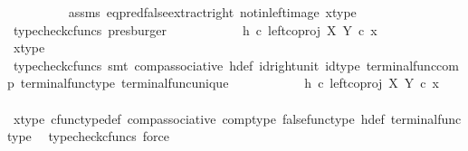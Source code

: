 \begin{isabellebody}
\ \ \ \ \ \ \ \ \isamarkupfalse%
\ assms\ eq{\isacharunderscore}{\kern0pt}pred{\isacharunderscore}{\kern0pt}false{\isacharunderscore}{\kern0pt}extract{\isacharunderscore}{\kern0pt}right\ not{\isacharunderscore}{\kern0pt}in{\isacharunderscore}{\kern0pt}left{\isacharunderscore}{\kern0pt}image\ x{\isacharunderscore}{\kern0pt}type\ \isamarkupfalse%
\ {\isacharparenleft}{\kern0pt}typecheck{\isacharunderscore}{\kern0pt}cfuncs{\isacharcomma}{\kern0pt}\ presburger{\isacharparenright}{\kern0pt}\isanewline
\ \ \ \ \ \ \isamarkupfalse%
\ \isamarkupfalse%
\ {\isachardoublequoteopen}{\isachardot}{\kern0pt}{\isachardot}{\kern0pt}{\isachardot}{\kern0pt}\ {\isacharequal}{\kern0pt}\ h\ {\isasymcirc}\isactrlsub c\ {\isacharparenleft}{\kern0pt}left{\isacharunderscore}{\kern0pt}coproj\ X\ Y\ {\isasymcirc}\isactrlsub c\ x{\isacharparenright}{\kern0pt}{\isachardoublequoteclose}\isanewline
\ \ \ \ \ \ \ \ \isamarkupfalse%
\ x{\isacharunderscore}{\kern0pt}type\ \isamarkupfalse%
\ {\isacharparenleft}{\kern0pt}typecheck{\isacharunderscore}{\kern0pt}cfuncs{\isacharcomma}{\kern0pt}\ smt\ comp{\isacharunderscore}{\kern0pt}associative{}\ h{\isacharunderscore}{\kern0pt}def\ id{\isacharunderscore}{\kern0pt}right{\isacharunderscore}{\kern0pt}unit{}\ id{\isacharunderscore}{\kern0pt}type\ terminal{\isacharunderscore}{\kern0pt}func{\isacharunderscore}{\kern0pt}comp\ terminal{\isacharunderscore}{\kern0pt}func{\isacharunderscore}{\kern0pt}type\ terminal{\isacharunderscore}{\kern0pt}func{\isacharunderscore}{\kern0pt}unique{\isacharparenright}{\kern0pt}\isanewline
\ \ \ \ \ \ \isamarkupfalse%
\ \isamarkupfalse%
\ {\isachardoublequoteopen}{\isachardot}{\kern0pt}{\isachardot}{\kern0pt}{\isachardot}{\kern0pt}\ {\isacharequal}{\kern0pt}\ {\isacharparenleft}{\kern0pt}h\ {\isasymcirc}\isactrlsub c\ left{\isacharunderscore}{\kern0pt}coproj\ X\ Y{\isacharparenright}{\kern0pt}\ {\isasymcirc}\isactrlsub c\ x{\isachardoublequoteclose}\isanewline
\ \ \ \ \ \ \ \ \ \ \ \ \ \isamarkupfalse%
\ x{\isacharunderscore}{\kern0pt}type\ cfunc{\isacharunderscore}{\kern0pt}type{\isacharunderscore}{\kern0pt}def\ comp{\isacharunderscore}{\kern0pt}associative\ comp{\isacharunderscore}{\kern0pt}type\ false{\isacharunderscore}{\kern0pt}func{\isacharunderscore}{\kern0pt}type\ h{\isacharunderscore}{\kern0pt}def\ terminal{\isacharunderscore}{\kern0pt}func{\isacharunderscore}{\kern0pt}type\ \isamarkupfalse%
\ {\isacharparenleft}{\kern0pt}typecheck{\isacharunderscore}{\kern0pt}cfuncs{\isacharcomma}{\kern0pt}\ force{\isacharparenright}{\kern0pt}\isanewline

\end{isabellebody}

